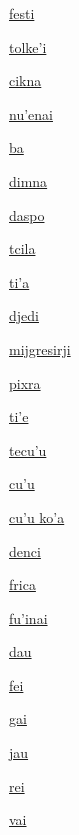 {\hyperlink{val:festi}{festi}}{}{}{}

{\hyperlink{val:tolkehi}{tolke'i}}{}{}{}

{\hyperlink{val:cikna}{cikna}}{}{}{}

{\hyperlink{val:nuhenai}{nu'enai}}{}{}{}

{\hyperlink{val:ba}{ba}}{}{}{}

{\hyperlink{val:dimna}{dimna}}{}{}{}

{\hyperlink{val:daspo}{daspo}}{}{}{}

{\hyperlink{val:tcila}{tcila}}{}{}{}

{\hyperlink{val:tiha}{ti'a}}{}{}{}

{\hyperlink{val:djedi}{djedi}}{}{}{}

{\hyperlink{val:mijgresirji}{mijgresirji}}{}{}{}

{\hyperlink{val:pixra}{pixra}}{}{}{}

{\hyperlink{val:tihe}{ti'e}}{}{}{}

{\hyperlink{val:tecuhu}{tecu'u}}{}{}{}

{\hyperlink{val:cuhu}{cu'u}}{}{}{}

{\hyperlink{val:cuhu koha}{cu'u ko'a}}{}{}{}

{\hyperlink{val:denci}{denci}}{}{}{}

{\hyperlink{val:frica}{frica}}{}{}{}

{\hyperlink{val:fuhinai}{fu'inai}}{}{}{}

{\hyperlink{val:dau}{dau}}{}{}{}

{\hyperlink{val:fei}{fei}}{}{}{}

{\hyperlink{val:gai}{gai}}{}{}{}

{\hyperlink{val:jau}{jau}}{}{}{}

{\hyperlink{val:rei}{rei}}{}{}{}

{\hyperlink{val:vai}{vai}}{}{}{}

